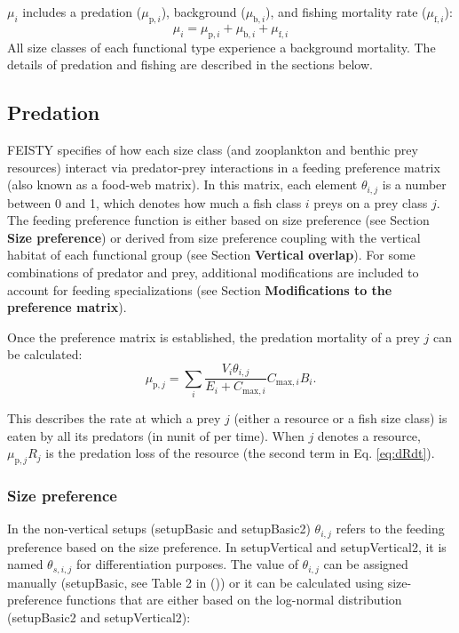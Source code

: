 \documentclass[
]{article}
\begin{document}
\(\mu_i\) includes a predation (\(\mu_{\mathrm{p},i}\)), background
(\(\mu_{\mathrm{b},i}\)), and fishing mortality rate
(\(\mu_{\mathrm{f},i}\)): \begin{equation}
\mu_i = \mu_{\mathrm{p},i}+\mu_{\mathrm{b},i}+\mu_{\mathrm{f},i}
\end{equation} All size classes of each functional type experience a
background mortality. The details of predation and fishing are described
in the sections below.

\subsection{Predation}\label{predation}

FEISTY specifies of how each size class (and zooplankton and benthic
prey resources) interact via predator-prey interactions in a feeding
preference matrix (also known as a food-web matrix). In this matrix,
each element \(\theta_{i,j}\) is a number between 0 and 1, which denotes
how much a fish class \(i\) preys on a prey class \(j\). The feeding
preference function is either based on size preference (see Section
\textbf{Size preference}) or derived from size preference coupling with
the vertical habitat of each functional group (see Section
\textbf{Vertical overlap}). For some combinations of predator and prey,
additional modifications are included to account for feeding
specializations (see Section \textbf{Modifications to the preference
matrix}).

Once the preference matrix is established, the predation mortality of a
prey \(j\) can be calculated: \begin{equation}
\mu_{\mathrm{p},j} = \sum_i  \frac{V_i \theta_{i,j}}{E_i+C_{\mathrm{max},i}} C_{\mathrm{max},i} B_i .    \label{eq:predationmortality}
\end{equation}

This describes the rate at which a prey \(j\) (either a resource or a
fish size class) is eaten by all its predators (in nunit of per time).
When \(j\) denotes a resource, \(\mu_{\mathrm{p},j} R_j\) is the
predation loss of the resource (the second term in Eq. \ref{eq:dRdt}).

\subsubsection{Size preference}\label{size-preference}

In the non-vertical setups (setupBasic and setupBasic2) \(\theta_{i,j}\)
refers to the feeding preference based on the size preference. In
setupVertical and setupVertical2, it is named \(\theta_{s,i,j}\) for
differentiation purposes. The value of \(\theta_{i,j}\) can be assigned
manually (setupBasic, see Table 2 in
()) or it can be
calculated using size-preference functions that are either based on the
log-normal distribution (setupBasic2 and setupVertical2):
\end{document}
